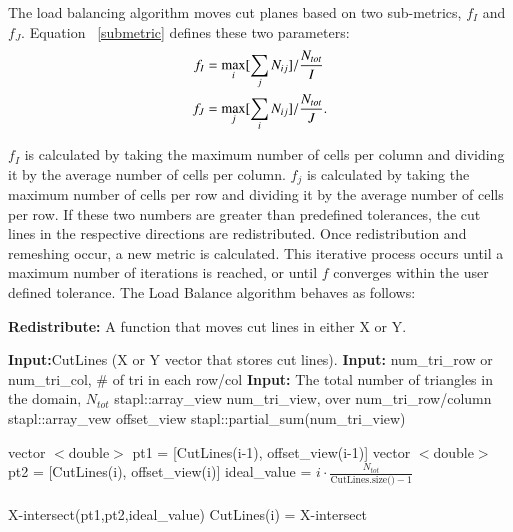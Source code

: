 \documentclass{anstrans}
\begin{document}
The load balancing algorithm moves cut planes based on two sub-metrics, $f_I$ and $f_J$. Equation ~\eqref{submetric} defines these two parameters:
\begin{align}
f_I &= \underset{i}{\text{max}}[\sum_{j} N_{ij}]/\frac{N_{tot}}{I} \notag \\
f_J &= \underset{j}{\text{max}}[\sum_{i} N_{ij}]/\frac{N_{tot}}{J}.
\label{submetric}
\end{align}

$f_I$ is calculated by taking the maximum number of cells per column and dividing it by the average number of cells per column. $f_j$ is calculated by taking the maximum number of cells per row and dividing it by the average number of cells per row. If these two numbers are greater than predefined tolerances, the cut lines in the respective directions are redistributed. Once redistribution and remeshing occur, a new metric is calculated. This iterative process occurs until a maximum number of iterations is reached, or until $f$ converges within the user defined tolerance. The Load Balance algorithm behaves as follows:



\noindent\begin{minipage}{\textwidth}
\textbf{Redistribute:} A function that moves cut lines in either X or Y. \\
\begin{algorithmic}
\STATE \textbf{Input:}CutLines (X or Y vector that stores cut lines). 
\STATE \textbf{Input:} num\_tri\_row or num\_tri\_col, \# of tri in each row/col
\STATE \textbf{Input:} The total number of triangles in the domain, $N_{tot}$
\STATE stapl::array\_view num\_tri\_view, over num\_tri\_row/column
\STATE stapl::array\_vew offset\_view
\STATE stapl::partial\_sum(num\_tri\_view) \\

	\STATE vector $<$double$>$ pt1 = [CutLines(i-1), offset\_view(i-1)]
	\STATE vector $<$double$>$ pt2 = [CutLines(i), offset\_view(i)]
	\STATE ideal\_value = $i\cdot \frac{N_{tot}}{\text{CutLines.size()}-1}$\\
         \\
	\STATE X-intersect(pt1,pt2,ideal\_value)	\STATE CutLines(i) = X-intersect
\ENDFOR
\end{algorithmic}
\end{minipage} 
\end{document}

